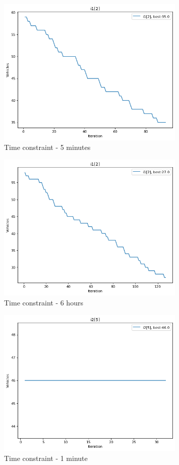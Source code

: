 \documentclass{article}
\begin{document}
\begin{figure}
\centering
\includegraphics[width=0.8\textwidth]{i1[2]_5_vehicles.png}
\caption{\label{fig:i1[2]_5_vehicles}Time constraint - 5 minutes}
\end{figure}

\begin{figure}
\centering
\includegraphics[width=0.8\textwidth]{i1[2]_360_vehicles.png}
\caption{\label{fig:i1[2]_360_vehicles}Time constraint - 6 hours}
\end{figure}

\begin{figure}
\centering
\includegraphics[width=0.8\textwidth]{i2[5]_1_vehicles.png}
\caption{\label{fig:i2[5]_1_vehicles}Time constraint - 1 minute}
\end{figure}
\end{document}
